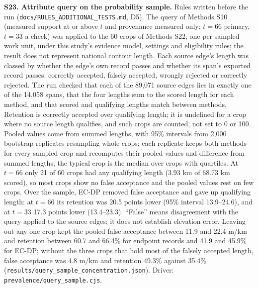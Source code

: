 \documentclass[11pt]{article}
\begin{document}
\noindent\textbf{S23. Attribute query on the probability sample.} Rules written before the run (\texttt{docs/\allowbreak RULES\_\allowbreak ADDITIONAL\_\allowbreak TESTS.md}, D5). The query of Methods S10 (measured support at or above $t$ and provenance measured only; $t=66$ primary, $t=33$ a check) was applied to the 60 crops of Methods S22, one per sampled work unit, under this study's evidence model, settings and eligibility rules; the result does not represent national contour length. Each source edge's length was classed by whether the edge's own record passes and whether its span's exported record passes: correctly accepted, falsely accepted, wrongly rejected or correctly rejected. The run checked that each of the 89,071 source edges lies in exactly one of the 14,058 spans, that the four lengths sum to the scored length for each method, and that scored and qualifying lengths match between methods. Retention is correctly accepted over qualifying length; it is undefined for a crop where no source length qualifies, and such crops are counted, not set to 0 or 100. Pooled values come from summed lengths, with 95\% intervals from 2{,}000 bootstrap replicates resampling whole crops; each replicate keeps both methods for every sampled crop and recomputes their pooled values and difference from summed lengths; the typical crop is the median over crops with quartiles. At $t=66$ only 21 of 60 crops had any qualifying length (3.93 km of 68.73 km scored), so most crops show no false acceptance and the pooled values rest on few crops. Over the sample, EC-DP removed false acceptance and gave up qualifying length: at $t=66$ its retention was 20.5 points lower (95\% interval 13.9--24.6), and at $t=33$ 17.3 points lower (13.4--23.3). ``False'' means disagreement with the query applied to the source edges; it does not establish elevation error. Leaving out any one crop kept the pooled false acceptance between 11.9 and 22.4 m/km and retention between 60.7 and 66.4\% for endpoint records and 41.9 and 45.9\% for EC-DP; without the three crops that hold most of the falsely accepted length, false acceptance was 4.8 m/km and retention 49.3\% against 35.4\% (\texttt{results/query\_sample\_concentration.json}). Driver: \texttt{prevalence/query\_sample.cjs}.
\end{document}
